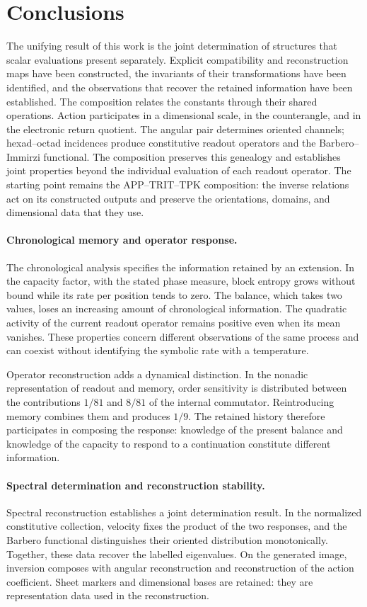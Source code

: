 \section{Conclusions}
\label{md:conclusiones}
The unifying result of this work is the joint determination of structures
that scalar evaluations present separately. Explicit compatibility and
reconstruction maps have been constructed, the invariants of their
transformations have been identified, and the observations that recover
the retained information have been established. The composition relates
the constants through their shared operations.
Action participates in a dimensional scale, in the counterangle, and in
the electronic return quotient. The angular pair determines oriented
channels; hexad--octad incidences produce constitutive readout operators
and the Barbero--Immirzi functional. The composition preserves this
genealogy and establishes joint properties beyond the individual
evaluation of each readout operator. The starting point remains the
APP--TRIT--TPK composition: the inverse relations act on its constructed
outputs and preserve the orientations, domains, and dimensional data
that they use.

\paragraph{Chronological memory and operator response.}
The chronological analysis specifies the information retained by an
extension. In the capacity factor, with the stated phase measure, block
entropy grows without bound while its rate per position tends to zero.
The balance, which takes two values, loses an increasing amount of
chronological information. The quadratic activity of the current readout
operator remains positive even when its mean vanishes. These properties
concern different observations of the same process and can coexist
without identifying the symbolic rate with a temperature.

Operator reconstruction adds a dynamical distinction. In the nonadic
representation of readout and memory, order sensitivity is distributed
between the contributions \(1/81\) and \(8/81\) of the internal
commutator. Reintroducing memory combines them and produces \(1/9\).
The retained history therefore participates in composing the response:
knowledge of the present balance and knowledge of the capacity to respond
to a continuation constitute different information.

\paragraph{Spectral determination and reconstruction stability.}
Spectral reconstruction establishes a joint determination result. In the
normalized constitutive collection, velocity fixes the product of the two
responses, and the Barbero functional distinguishes their oriented
distribution monotonically. Together, these data recover the labelled
eigenvalues. On the generated image, inversion composes with angular
reconstruction and reconstruction of the action coefficient. Sheet
markers and dimensional bases are retained: they are representation data
used in the reconstruction.

